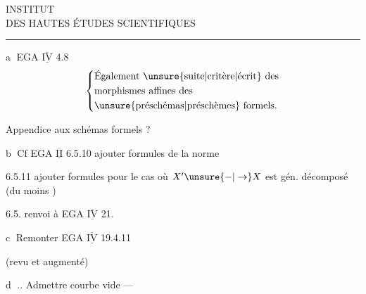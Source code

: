 \begin{center}
INSTITUT\\
DES HAUTES ÉTUDES SCIENTIFIQUES\\[-.3ex]
\rule{1.3cm}{.4pt}
\end{center}

\textcircled{a} \quad {} EGA $\underline{\overline{\mathrm{IV}}}$ 4.8
\[
\left\{\begin{aligned}
&\text{Également \unsure{suite|critère|écrit} des}\\
&\text{morphismes affines des}\\
&\text{\unsure{préschémas|préschèmes} formels.}
\end{aligned}\right.
\]

{\reversemarginpar\margin{!}}Appendice   aux schémas formels ?

\textcircled{b} \quad Cf EGA $\underline{\overline{\mathrm{II}}}$ 6.5.10 ajouter formules de la norme

6.5.11 ajouter formules pour le cas où $X'\unsure{\mathbin{-}|\to}X$ est gén. décomposé (du moins )

6.5. renvoi à EGA $\underline{\overline{\mathrm{IV}}}$ 21.

\textcircled{c} \quad Remonter EGA $\underline{\overline{\mathrm{IV}}}$ 19.4.11

(revu et augmenté)

\textcircled{d} .. Admettre courbe vide ---

